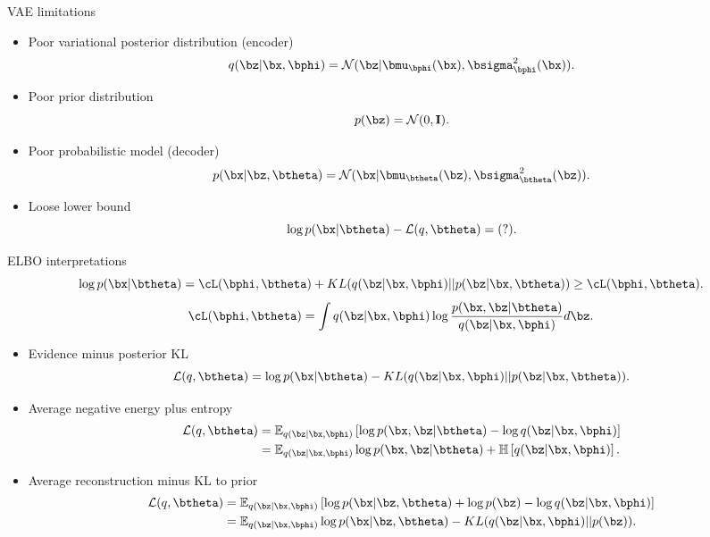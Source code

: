 \begin{frame}{VAE limitations}
\begin{itemize}
	\item Poor variational posterior distribution (encoder)
	\[
		q(\bz | \bx, \bphi) = \mathcal{N}(\bz| \bmu_{\bphi}(\bx), \bsigma^2_{\bphi}(\bx)).
	\]
	\item Poor prior distribution
	\[
		p(\bz) = \mathcal{N}(0, \mathbf{I}).
	\]
	\item Poor probabilistic model (decoder)
	\[
		p(\bx | \bz, \btheta) = \mathcal{N}(\bx| \bmu_{\btheta}(\bz), \bsigma^2_{\btheta}(\bz)).
	\]
	\item Loose lower bound
	\[
		\log p(\bx | \btheta) - \mathcal{L}(q, \btheta) = (?).
	\]
\end{itemize}
\end{frame}
\begin{frame}{ELBO interpretations}
	\[
		\log p(\bx | \btheta) = \cL (\bphi, \btheta) + KL(q(\bz | \bx, \bphi) || p(\bz | \bx, \btheta)) \geq  \cL (\bphi, \btheta).
	\]
	\[
		\cL (\bphi, \btheta) = \int q(\bz | \bx, \bphi) \log \frac{p(\bx, \bz | \btheta)}{q(\bz | \bx, \bphi)} d \bz.
	\]
	\begin{itemize}
	    \item Evidence minus posterior KL
	    \vspace{-0.1cm}
	    \[
	        \mathcal{L}(q, \btheta) = \log p(\bx | \btheta) - KL(q(\bz | \bx, \bphi) || p(\bz | \bx, \btheta)).
	    \]
	    \item Average negative energy plus entropy
	    \vspace{-0.1cm}
	    \begin{align*}
	        \mathcal{L}(q, \btheta) &= \mathbb{E}_{q(\bz | \bx, \bphi)} \left[\log p(\bx, \bz | \btheta) - \log q(\bz | \bx, \bphi)  \right] \\
	        &= \mathbb{E}_{q(\bz | \bx, \bphi)} \log p(\bx, \bz | \btheta) + \mathbb{H} \left[q(\bz | \bx, \bphi) \right].
	    \end{align*}
	    \item Average reconstruction minus KL to prior
	    \vspace{-0.1cm}
	    \begin{align*}
	        \mathcal{L}(q, \btheta) &= \mathbb{E}_{q(\bz | \bx, \bphi)} \left[ \log p(\bx | \bz, \btheta) + \log p(\bz) - \log q(\bz | \bx, \bphi) \right] \\
	        &= \mathbb{E}_{q(\bz | \bx, \bphi)} \log p(\bx | \bz, \btheta) - KL(q(\bz | \bx, \bphi) || p(\bz)).
	    \end{align*}
	\end{itemize}
\end{frame}
